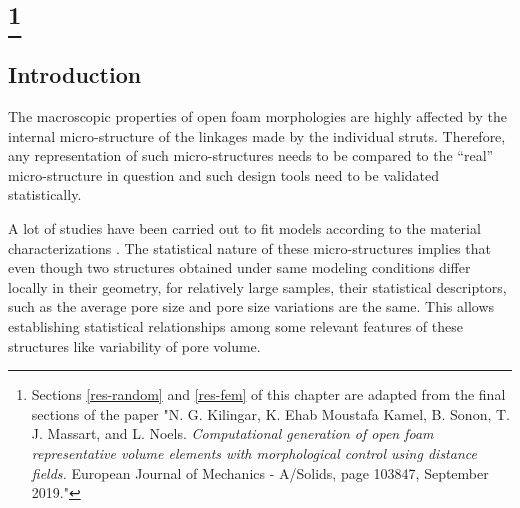 \chapter[\titleres]{\titleres\footnote{Sections \ref{res-random} and \ref{res-fem} of this chapter are adapted from the final sections of the paper "N. G. Kilingar, K. Ehab Moustafa Kamel, B. Sonon, T. J. Massart, and L. Noels.	\textit{Computational generation of open foam representative volume elements with morphological control using distance fields.} European Journal of Mechanics - A/Solids, page 103847, September 2019."}}\label{chap-res}
\section{Introduction}
The macroscopic properties of open foam morphologies are highly affected by the internal micro-structure of the linkages made by the individual struts. Therefore, any representation of such micro-structures needs to be compared to the ``real'' micro-structure in question and such design tools need to be validated statistically. 

A lot of studies have been carried out to fit  models according to the material characterizations \cite{redenbachMicrostructureModelsCellular2009,vecchioAnglesLaguerreTessellation2014}. The statistical nature of these micro-structures implies that even though two structures obtained under same modeling conditions differ locally in their geometry, for relatively large samples, their statistical descriptors, such as the average pore size and pore size variations are the same. This allows establishing statistical relationships among some relevant features of these structures like variability of pore volume.

